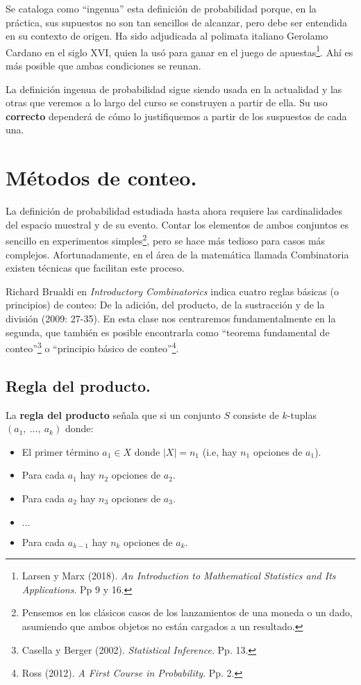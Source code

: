 \documentclass[12pt]{article}
\begin{document}
Se cataloga como ``ingenua'' esta definición de probabilidad porque, en la práctica, sus supuestos no son tan sencillos de alcanzar, pero debe ser entendida en su contexto de origen. Ha sido adjudicada al polimata italiano Gerolamo Cardano en el siglo XVI, quien la usó para ganar en el juego de apuestas\footnote{Larsen y Marx (2018). \textit{An Introduction to Mathematical Statistics and Its Applications}. Pp 9 y 16.}. Ahí es más posible que ambas condiciones se reunan.

La definición ingenua de probabilidad sigue siendo usada en la actualidad y las otras que veremos a lo largo del curso se construyen a partir de ella. Su uso \textbf{correcto} dependerá de cómo lo justifiquemos a partir de los suspuestos de cada una.


\section{Métodos de conteo.}

La definición de probabilidad estudiada hasta ahora requiere las cardinalidades del espacio muestral y de su evento. Contar los elementos de ambos conjuntos es sencillo en experimentos simples\footnote{Pensemos en los clásicos casos de los lanzamientos de una moneda o un dado, asumiendo que ambos objetos no están cargados a un resultado.}, pero se hace más tedioso para casos más complejos. Afortunadamente, en el área de la matemática llamada Combinatoria existen técnicas que facilitan este proceso.

Richard Brualdi en \textit{Introductory Combinatorics} indica cuatro reglas básicas (o principios) de conteo: De la adición, del producto, de la sustracción y de la división (2009: 27-35). En esta clase nos centraremos fundamentalmente en la segunda, que también es posible encontrarla como ``teorema fundamental de conteo''\footnote{Casella y Berger (2002). \textit{Statistical Inference}. Pp. 13.} o ``principio básico de conteo''\footnote{Ross (2012). \textit{A First Course in Probability}. Pp. 2.}.

\subsection{Regla del producto.}

La \textbf{regla del producto} señala que si un conjunto $S$ consiste de $k$-tuplas $(a_{1}, \ \ldots, \ a_{k})$ donde:

\begin{itemize}
\item El primer término $a_{1} \in X$ donde $|X| = n_{1}$ (i.e, hay $n_{1}$ opciones de $a_{1}$).
\item Para cada $a_{1}$ hay $n_{2}$ opciones de $a_{2}$.
\item Para cada $a_{2}$ hay $n_{3}$ opciones de $a_{3}$.
\item $\ldots$
\item Para cada $a_{k - 1}$ hay $n_{k}$ opciones de $a_{k}$.
\end{itemize}
\end{document}
